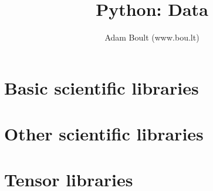 \documentclass[oneside]{book}
\begin{document}
\author{Adam Boult (www.bou.lt)}
\title{Python: Data}
\maketitle

\setcounter{tocdepth}{0}
\tableofcontents



\part{Basic scientific libraries}





\part{Other scientific libraries}







\part{Tensor libraries}



\end{document}
